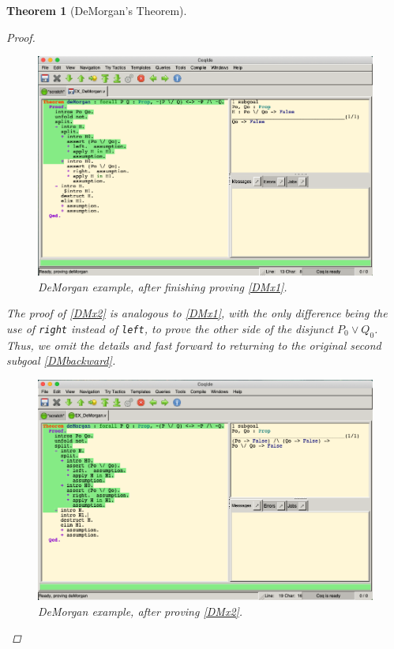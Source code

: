 \documentclass[12pt,notitlepage]{report}
\theoremstyle{plain}
\newtheorem{theo}{Theorem}[section]
\theoremstyle{definition}
\numberwithin{equation}{section}
\begin{document}
\begin{theo}[DeMorgan's Theorem]
\begin{proof}
\begin{figure}[H]
    \centering
          \includegraphics[scale=0.45]{DeMorgan5}
              \caption{DeMorgan example, after finishing proving \eqref{DMx1}.}
    \label{fig:demorgan1}
\end{figure}
        \par \medskip
        The proof of \eqref{DMx2} is analogous to \eqref{DMx1}, with the only difference being the use of \texttt{right} instead of \texttt{left}, to prove the other side of the disjunct $P_0 \lor Q_0$.  Thus, we omit the details and fast forward to returning to the original second subgoal \eqref{DMbackward}.
        \par \medskip
          \noindent
\begin{figure}[H]
    \centering
          \includegraphics[scale=0.45]{DeMorgan6}
              \caption{DeMorgan example, after proving \eqref{DMx2}.}
    \label{fig:demorgan1}
\end{figure}

\end{proof}
\end{theo}
\end{document}
